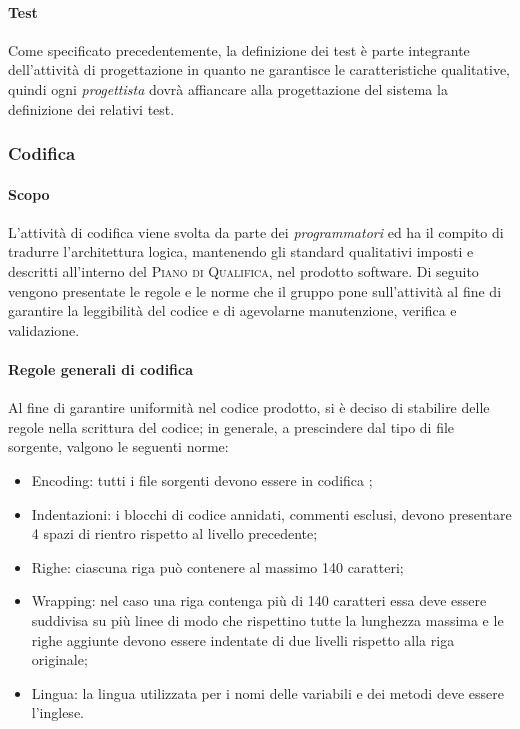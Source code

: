 \paragraph{Test}

Come specificato precedentemente, la definizione dei test è parte integrante dell'attività di progettazione in quanto ne garantisce le
caratteristiche qualitative, quindi ogni \emph{progettista} dovrà affiancare alla progettazione del sistema la definizione dei relativi test.

\subsubsection{Codifica}
\label{ssub:codifica}

\paragraph{Scopo}
\label{par:codifica:scopo}

L'attività di codifica viene svolta da parte dei \emph{programmatori} ed ha il compito di tradurre l'architettura logica, mantenendo gli
standard qualitativi imposti e descritti all'interno del \textsc{Piano di Qualifica}, nel prodotto software. Di seguito vengono presentate
le regole e le norme che il gruppo pone sull'attività al fine di garantire la leggibilità del codice e di agevolarne manutenzione,
verifica e validazione.

\paragraph{Regole generali di codifica}
\label{par:stile_codifica}

Al fine di garantire uniformità nel codice prodotto, si è deciso di stabilire delle regole nella scrittura del codice; in generale, a
prescindere dal tipo di file sorgente, valgono le seguenti norme:
\begin{itemize}
	\item Encoding: tutti i file sorgenti devono essere in codifica ;
    \item Indentazioni: i blocchi di codice annidati, commenti esclusi, devono presentare 4 spazi di rientro rispetto al livello precedente;
    \item Righe: ciascuna riga può contenere al massimo 140 caratteri;
    \item Wrapping: nel caso una riga contenga più di 140 caratteri essa deve essere suddivisa su più linee di modo che rispettino tutte
    	la lunghezza massima e le righe aggiunte devono essere indentate di due livelli rispetto alla riga originale;
    \item Lingua: la lingua utilizzata per i nomi delle variabili e dei metodi deve essere l'inglese.
\end{itemize}



